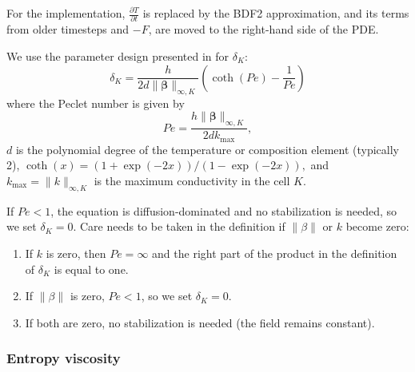 \documentclass{article}
\begin{document}
For the implementation, $\frac{\partial T}{\partial t}$ is replaced by the BDF2 approximation, and its terms from older timesteps and $-F$, are moved to the right-hand side of the PDE.

We use the parameter design presented in \cite{JohnKnobloch2006} for $\delta_K$:
\[
 \delta_K = \frac{h}{2d\|\mathbf{\beta}\|_{\infty,K}} \left( \coth(Pe)-\frac{1}{Pe} \right)
\]
where the Peclet number is given by
\[
 Pe = \frac{ h \| \mathbf{\beta} \|_{\infty,K}}{2 d k_\text{max}},
\]
$d$ is the polynomial degree of the temperature or composition element (typically 2),
$
 \coth(x) = (1+\exp(-2x)) / (1-\exp(-2x)),
$
and $k_\text{max}=\| k \|_{\infty, K}$ is the maximum conductivity in the cell $K$.

If $Pe<1$, the equation is diffusion-dominated and no stabilization is needed, so we
set $\delta_K=0$. Care needs to be taken in the definition if $\| \beta \|$ or $k$ become zero:
\begin{enumerate}
\item If $k$ is zero, then $Pe=\infty$ and the right part of the product in the definition of $\delta_K$ is equal to one.
\item If $\| \beta \|$ is zero, $Pe < 1$, so we set $\delta_K=0$.
\item If both are zero, no stabilization is needed (the field remains constant).
\end{enumerate}

\subsubsection{Entropy viscosity}
\end{document}

